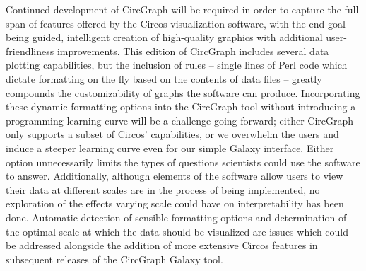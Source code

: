 \documentclass[twocolumn]{article}
\newcommand{\projectName}{CircGraph\xspace}
\begin{document}
Continued development of \projectName will be required in order to capture the full span of features offered by the Circos visualization software, with the end goal being guided, intelligent creation of high-quality graphics with additional user-friendliness improvements. This edition of \projectName includes several data plotting capabilities, but the inclusion of rules -- single lines of Perl code which dictate formatting on the fly based on the contents of data files -- greatly compounds the customizability of graphs the software can produce. Incorporating these dynamic formatting options into the \projectName tool without introducing a programming learning curve will be a challenge going forward; either \projectName only supports a subset of Circos' capabilities, or we overwhelm the users and induce a steeper learning curve even for our simple Galaxy interface. Either option unnecessarily limits the types of questions scientists could use the software to answer. Additionally, although elements of the software allow users to view their data at different scales are in the process of being implemented, no exploration of the effects varying scale could have on interpretability has been done. Automatic detection of sensible formatting options and determination of the optimal scale at which the data should be visualized are issues which could be addressed alongside the addition of more extensive Circos features in subsequent releases of the \projectName Galaxy tool.

\printbibliography
\end{document}
